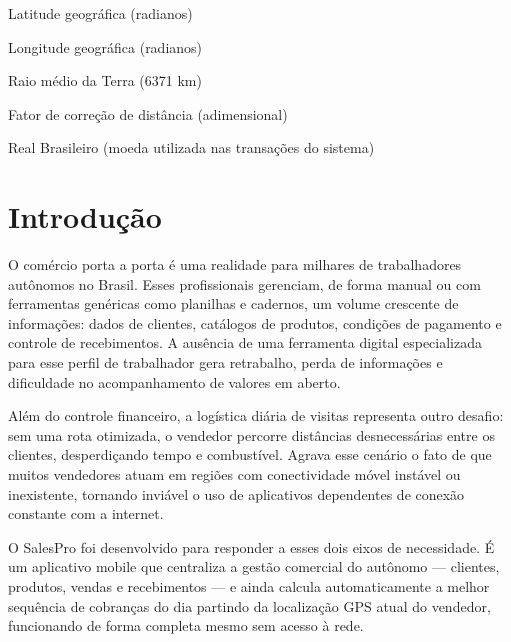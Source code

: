 \documentclass[
	12pt,				%
	oneside,			%
	a4paper,			%
	english,			%
	brazil				%
	]{abntex2}
\begin{document}
\begin{simbolos}
  \item[$\varphi$] Latitude geográfica (radianos)
  \item[$\lambda$] Longitude geográfica (radianos)
  \item[$r$] Raio médio da Terra (6371 km)
  \item[$f$] Fator de correção de distância (adimensional)
  \item[R\$] Real Brasileiro (moeda utilizada nas transações do sistema)
\end{simbolos}

\tableofcontents*
\cleardoublepage



\textual

\chapter*[Introdução]{Introdução}

O comércio porta a porta é uma realidade para milhares de trabalhadores autônomos no Brasil. Esses profissionais gerenciam, de forma manual ou com ferramentas genéricas como planilhas e cadernos, um volume crescente de informações: dados de clientes, catálogos de produtos, condições de pagamento e controle de recebimentos. A ausência de uma ferramenta digital especializada para esse perfil de trabalhador gera retrabalho, perda de informações e dificuldade no acompanhamento de valores em aberto.

Além do controle financeiro, a logística diária de visitas representa outro desafio: sem uma rota otimizada, o vendedor percorre distâncias desnecessárias entre os clientes, desperdiçando tempo e combustível. Agrava esse cenário o fato de que muitos vendedores atuam em regiões com conectividade móvel instável ou inexistente, tornando inviável o uso de aplicativos dependentes de conexão constante com a internet.

O SalesPro foi desenvolvido para responder a esses dois eixos de necessidade. É um aplicativo mobile que centraliza a gestão comercial do autônomo — clientes, produtos, vendas e recebimentos — e ainda calcula automaticamente a melhor sequência de cobranças do dia partindo da localização GPS atual do vendedor, funcionando de forma completa mesmo sem acesso à rede.
\end{document}
